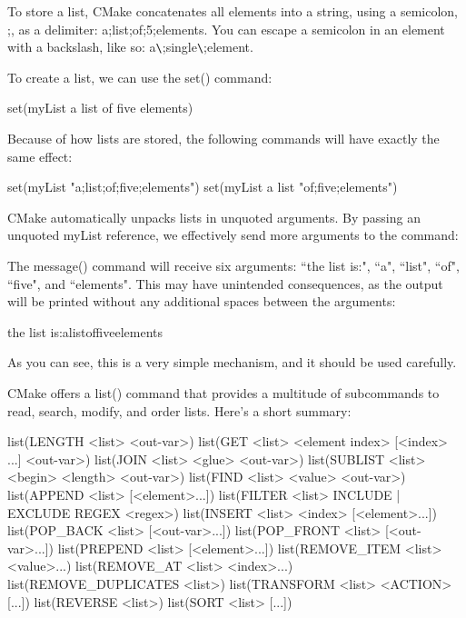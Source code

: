 To store a list, CMake concatenates all elements into a string, using a semicolon, ;, as a delimiter: a;list;of;5;elements. You can escape a semicolon in an element with a backslash, like so: a\verb|\|;single\verb|\|;element.

To create a list, we can use the set() command:

\begin{cmake}
    set(myList a list of five elements)
\end{cmake}

Because of how lists are stored, the following commands will have exactly the same effect:

\begin{cmake}
    set(myList "a;list;of;five;elements")
    set(myList a list "of;five;elements")
\end{cmake}

CMake automatically unpacks lists in unquoted arguments. By passing an unquoted myList reference, we effectively send more arguments to the command:


The message() command will receive six arguments: “the list is:", “a", “list", “of", “five", and “elements". This may have unintended consequences, as the output will be printed without any additional spaces between the arguments:

\begin{shell}
    the list is:alistoffiveelements
\end{shell}

As you can see, this is a very simple mechanism, and it should be used carefully.

CMake offers a list() command that provides a multitude of subcommands to read, search, modify, and order lists. Here’s a short summary:

\begin{cmake}
    list(LENGTH <list> <out-var>)
    list(GET <list> <element index> [<index> ...] <out-var>)
    list(JOIN <list> <glue> <out-var>)
    list(SUBLIST <list> <begin> <length> <out-var>)
    list(FIND <list> <value> <out-var>)
    list(APPEND <list> [<element>...])
    list(FILTER <list> {INCLUDE | EXCLUDE} REGEX <regex>)
    list(INSERT <list> <index> [<element>...])
    list(POP_BACK <list> [<out-var>...])
    list(POP_FRONT <list> [<out-var>...])
    list(PREPEND <list> [<element>...])
    list(REMOVE_ITEM <list> <value>...)
    list(REMOVE_AT <list> <index>...)
    list(REMOVE_DUPLICATES <list>)
    list(TRANSFORM <list> <ACTION> [...])
    list(REVERSE <list>)
    list(SORT <list> [...])
\end{cmake}

